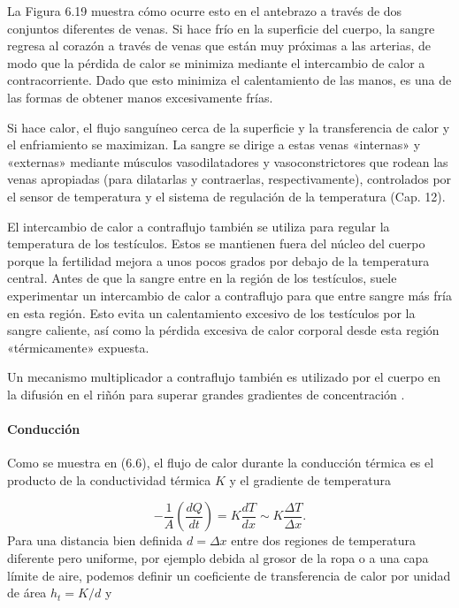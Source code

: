 \documentclass[12pt]{book}
\begin{document}
La Figura 6.19 muestra cómo ocurre esto en el antebrazo a través de dos conjuntos diferentes de venas. Si hace frío en la superficie del cuerpo, la sangre regresa al corazón a través de venas que están muy próximas a las arterias, de modo que la pérdida de calor se minimiza mediante el intercambio de calor a contracorriente. Dado que esto minimiza el calentamiento de las manos, es una de las formas de obtener manos excesivamente frías.

Si hace calor, el flujo sanguíneo cerca de la superficie y la transferencia de calor y el enfriamiento se maximizan. La sangre se dirige a estas venas «internas» y «externas» mediante músculos vasodilatadores y vasoconstrictores que rodean las venas apropiadas (para dilatarlas y contraerlas, respectivamente), controlados por el sensor de temperatura y el sistema de regulación de la temperatura (Cap. 12).

El intercambio de calor a contraflujo también se utiliza para regular la temperatura de los testículos. Estos se mantienen fuera del núcleo del cuerpo porque la fertilidad mejora a unos pocos grados por debajo de la temperatura central. Antes de que la sangre entre en la región de los testículos, suele experimentar un intercambio de calor a contraflujo para que entre sangre más fría en esta región. Esto evita un calentamiento excesivo de los testículos por la sangre caliente, así como la pérdida excesiva de calor corporal desde esta región «térmicamente» expuesta.

Un mecanismo multiplicador a contraflujo también es utilizado por el cuerpo en la difusión en el riñón para superar grandes gradientes de concentración \cite{69,95}.

\paragraph*{Conducción}

Como se muestra en (6.6), el flujo de calor durante la conducción térmica es el producto de la conductividad térmica $K$ y el gradiente de temperatura

\begin{equation}
-\frac{1}{A}\left(\frac{dQ}{dt}\right) = K\frac{dT}{dx} \sim K\frac{\Delta T}{\Delta x}.
\label{eq:668}
\end{equation}
Para una distancia bien definida $d = \Delta x$ entre dos regiones de temperatura diferente pero uniforme, por ejemplo debida al grosor de la ropa o a una capa límite de aire, podemos definir un coeficiente de transferencia de calor por unidad de área $h_t = K/d$ y
\end{document}
